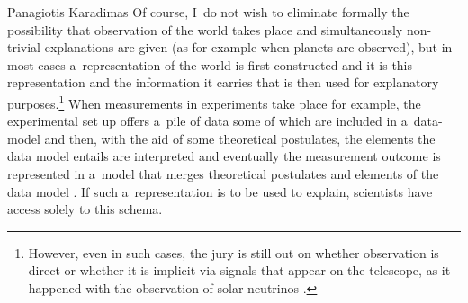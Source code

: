 \begin{artengenv}{Panagiotis Karadimas}
Of course, I~do not wish to eliminate formally the possibility that observation of the world takes place and simultaneously non-trivial explanations are given (as for example when planets are observed), but in most cases a~representation of the world is first constructed and it is this representation and the information it carries that is then used for explanatory purposes.\footnote{However, even in such cases, the jury is still out on whether observation is direct or whether it is implicit via signals that appear on the telescope, as it happened with the observation of solar neutrinos
\parencite[][]{shapere_concept_1982}. %
 } When measurements in experiments take place for example, the experimental set up offers a~pile of data some of which are included in a~data-model 
\parencite[][]{peschard_models_2018} %
 and then, with the aid of some theoretical postulates, the elements the data model entails are interpreted and eventually the measurement outcome is represented in a~model that merges theoretical postulates and elements of the data model 
\parencite[][]{parker_computer_2017}. %
 If such a~representation is to be used to explain, scientists have access solely to this schema.


\end{artengenv}
